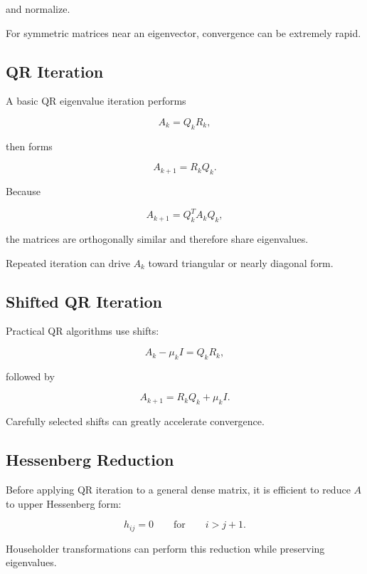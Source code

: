 and normalize.

For symmetric matrices near an eigenvector, convergence can be extremely
rapid.

\subsection{QR Iteration}
\label{subsec:qr-iteration}

A basic QR eigenvalue iteration performs

\[
A_k
=
Q_kR_k,
\]

then forms

\[
\boxed{
A_{k+1}
=
R_kQ_k.
}
\]

Because

\[
A_{k+1}
=
Q_k^TA_kQ_k,
\]

the matrices are orthogonally similar and therefore share eigenvalues.

Repeated iteration can drive \(A_k\) toward triangular or nearly diagonal
form.

\subsection{Shifted QR Iteration}
\label{subsec:shifted-qr-iteration}

Practical QR algorithms use shifts:

\[
A_k-\mu_kI
=
Q_kR_k,
\]

followed by

\[
\boxed{
A_{k+1}
=
R_kQ_k+\mu_kI.
}
\]

Carefully selected shifts can greatly accelerate convergence.

\subsection{Hessenberg Reduction}
\label{subsec:hessenberg-reduction}

Before applying QR iteration to a general dense matrix, it is efficient to
reduce \(A\) to upper Hessenberg form:

\[
\boxed{
h_{ij}=0
\qquad
\text{for}
\qquad
i>j+1.
}
\]

Householder transformations can perform this reduction while preserving
eigenvalues.

